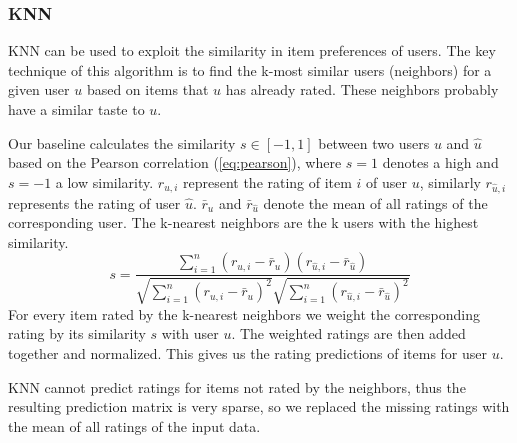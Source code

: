 \subsubsection{\ac{KNN}}



\ac{KNN}\cite{chae2018identifying} can be used to exploit the similarity in item preferences of users. The key technique of this algorithm is to find the k-most similar users (neighbors) for a given user $u$ based on items that $u$ has already rated\cite{zeng2004similarity}. These neighbors probably have a similar taste to $u$.

Our baseline calculates the similarity $s\in [-1,1]$ between two users $u$ and $\hat{u}$ based on the Pearson correlation (\ref{eq:pearson}), where $s=1$ denotes a high and $s=-1$ a low similarity. $r_{u,i}$ represent the rating of item $i$ of user $u$, similarly $r_{\hat{u},i}$ represents the rating of user $\hat{u}$. $\bar{r}_{u}$ and $\bar{r}_{\hat{u}}$ denote the mean of all ratings of the corresponding user. The k-nearest neighbors are the k users with the highest similarity.
\begin{equation}
    s = \frac{\sum_{i=1}^{n}(r_{u,i} - \bar{r}_{u})(r_{\hat{u},i} - \bar{r}_{\hat{u}})}{\sqrt{\sum_{i=1}^{n}(r_{u,i} - \bar{r}_{u})^2}\sqrt{\sum_{i=1}^{n}(r_{\hat{u},i} - \bar{r}_{\hat{u}})^2}}
    \label{eq:pearson}
\end{equation}
For every item rated by the k-nearest neighbors we weight the corresponding rating by its similarity $s$ with user $u$. The weighted ratings are then added together and normalized. This gives us the rating predictions of items for user $u$.

\ac{KNN} cannot predict ratings for items not rated by the neighbors, thus the resulting prediction matrix is very sparse, so we replaced the missing ratings with the mean of all ratings of the input data.